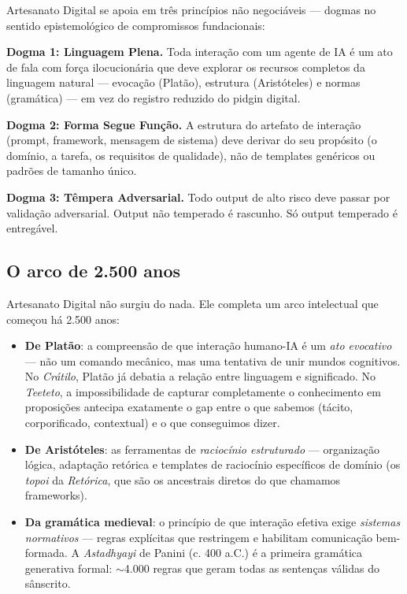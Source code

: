 \documentclass[12pt,a4paper]{article}
\begin{document}
Artesanato Digital se apoia em três princípios não negociáveis --- dogmas no sentido epistemológico de compromissos fundacionais:

\textbf{Dogma 1: Linguagem Plena.} Toda interação com um agente de IA é um ato de fala com força ilocucionária que deve explorar os recursos completos da linguagem natural --- evocação (Platão), estrutura (Aristóteles) e normas (gramática) --- em vez do registro reduzido do pidgin digital.

\textbf{Dogma 2: Forma Segue Função.} A estrutura do artefato de interação (prompt, framework, mensagem de sistema) deve derivar do seu propósito (o domínio, a tarefa, os requisitos de qualidade), não de templates genéricos ou padrões de tamanho único.

\textbf{Dogma 3: Têmpera Adversarial.} Todo output de alto risco deve passar por validação adversarial. Output não temperado é rascunho. Só output temperado é entregável.

\subsection{O arco de 2.500 anos}

Artesanato Digital não surgiu do nada. Ele completa um arco intelectual que começou há 2.500 anos:

\begin{itemize}
  \item \textbf{De Platão}: a compreensão de que interação humano-IA é um \emph{ato evocativo} --- não um comando mecânico, mas uma tentativa de unir mundos cognitivos. No \emph{Crátilo}, Platão já debatia a relação entre linguagem e significado. No \emph{Teeteto}, a impossibilidade de capturar completamente o conhecimento em proposições antecipa exatamente o gap entre o que sabemos (tácito, corporificado, contextual) e o que conseguimos dizer.

  \item \textbf{De Aristóteles}: as ferramentas de \emph{raciocínio estruturado} --- organização lógica, adaptação retórica e templates de raciocínio específicos de domínio (os \emph{topoi} da \emph{Retórica}, que são os ancestrais diretos do que chamamos frameworks).

  \item \textbf{Da gramática medieval}: o princípio de que interação efetiva exige \emph{sistemas normativos} --- regras explícitas que restringem e habilitam comunicação bem-formada. A \emph{Astadhyayi} de Panini (c. 400 a.C.) é a primeira gramática generativa formal: $\sim$4.000 regras que geram todas as sentenças válidas do sânscrito.
\end{itemize}
\end{document}

